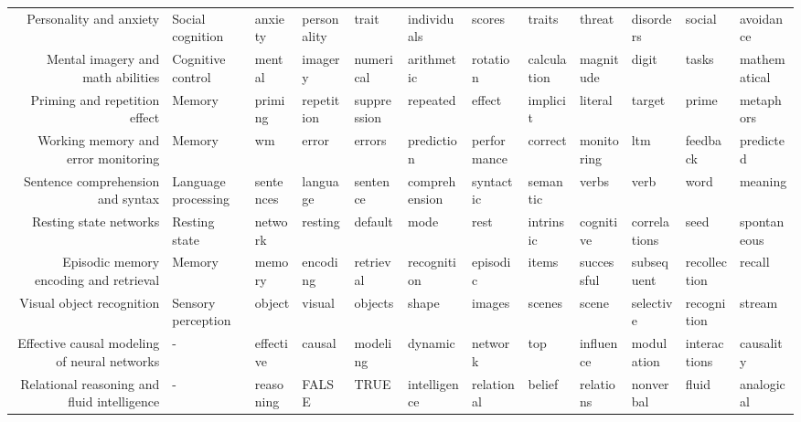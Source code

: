 \documentclass[english]{article}
\begin{document}
\begin{landscape}
\begin{center}
\begin{supertabular}{rlllllllllll}
             Personality and anxiety &    Social cognition &          anxiety &   personality &           trait &    individuals &      scores &         traits &        threat &      disorders &        social &      avoidance \\
   Mental imagery and math abilities &   Cognitive control &           mental &       imagery &       numerical &     arithmetic &    rotation &    calculation &     magnitude &          digit &         tasks &   mathematical \\
       Priming and repetition effect &              Memory &          priming &    repetition &     suppression &       repeated &      effect &       implicit &       literal &         target &         prime &      metaphors \\
 Working memory and error monitoring &              Memory &               wm &         error &          errors &     prediction & performance &        correct &    monitoring &            ltm &      feedback &      predicted \\
   Sentence comprehension and syntax & Language processing &        sentences &      language &        sentence &  comprehension &   syntactic &       semantic &         verbs &           verb &          word &        meaning \\
              Resting state networks &       Resting state &          network &       resting &         default &           mode &        rest &      intrinsic &     cognitive &   correlations &          seed &    spontaneous \\
Episodic memory encoding and retrieval &              Memory &           memory &      encoding &       retrieval &    recognition &    episodic &          items &    successful &     subsequent &  recollection &         recall \\
           Visual object recognition &  Sensory perception &           object &        visual &         objects &          shape &      images &         scenes &         scene &      selective &   recognition &         stream \\
Effective causal modeling of neural networks &                   - &        effective &        causal &        modeling &        dynamic &     network &            top &     influence &     modulation &  interactions &      causality \\
Relational reasoning and fluid intelligence &                   - &        reasoning &         FALSE &            TRUE &   intelligence &  relational &         belief &     relations &      nonverbal &         fluid &     analogical \\

\end{supertabular}
\end{center}
\end{landscape}
\end{document}
